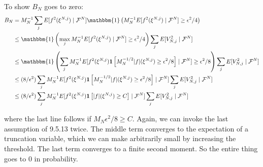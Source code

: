 \documentclass{article}
\begin{document}
To show $B_N$ goes to zero:
\begin{align*}
B_N &= M_N^{-1} \sum_j E[ f^2(\xi^{N,j}) \mid \mathcal{F}^N  ]  \mathbbm{1}\left( M_N^{-1} E[f^2(\xi^{N,j}) \mid \mathcal{F}^N] \ge \epsilon^2/4 \right) \\
&\le \mathbbm{1} \left( \max_j M_N^{-1} E[f^2(\xi^{N,j}) \mid \mathcal{F}^N] \ge \epsilon^2/4 \right) \sum_j E[ V_{N,j}^2 \mid \mathcal{F}^N] \\
&\le \mathbbm{1} \left( \sum_j M_N^{-1} E[f^2(\xi^{N,j})\mathbf{1}\left[M_N^{-1/2} |f|(\xi^{N,j}) \ge \epsilon^2/8 \right] \mid \mathcal{F}^N] \ge \epsilon^2/8 \right) \sum_j E[ V_{N,j}^2 \mid \mathcal{F}^N] \\
&\le (8/\epsilon^2) \sum_j M_N^{-1} E[f^2(\xi^{N,j})\mathbf{1}\left[M_N^{-1/2} |f|(\xi^{N,j}) \ge \epsilon^2/8 \right] \mid \mathcal{F}^N] \sum_j E[ V_{N,j}^2 \mid \mathcal{F}^N] \\
&\le (8/\epsilon^2) \sum_j M_N^{-1} E[f^2(\xi^{N,j})\mathbf{1}\left[|f|(\xi^{N,j}) \ge C \right] \mid \mathcal{F}^N] \sum_j E[ V_{N,j}^2 \mid \mathcal{F}^N] \\
\end{align*}

where the last line follows if $M_N \epsilon^2/8 \ge C$. Again, we can invoke the last assumption of 9.5.13 twice. The middle term converges to the expectation of a truncation variable, which we can make arbitrarily small by increasing the threshold. The last term converges to a finite second moment. So the entire thing goes to $0$ in probability.
\end{document}
